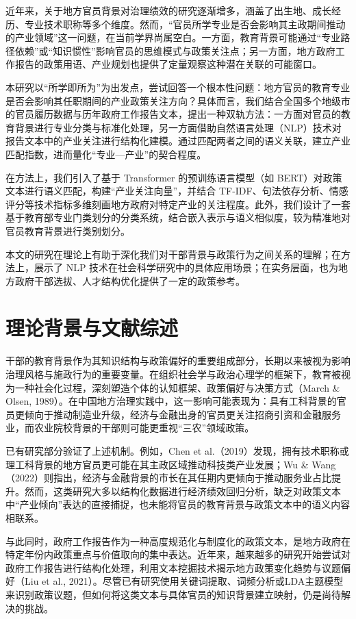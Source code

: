 \documentclass[a4paper,11pt, fontset=fandol]{ctexart}
\begin{document}
近年来，关于地方官员背景对治理绩效的研究逐渐增多，涵盖了出生地、成长经历、专业技术职称等多个维度。然而，“官员所学专业是否会影响其主政期间推动的产业领域”这一问题，在当前学界尚属空白。一方面，教育背景可能通过“专业路径依赖”或“知识惯性”影响官员的思维模式与政策关注点；另一方面，地方政府工作报告的政策用语、产业规划也提供了定量观察这种潜在关联的可能窗口。

本研究以“所学即所为”为出发点，尝试回答一个根本性问题：地方官员的教育专业是否会影响其任职期间的产业政策关注方向？具体而言，我们结合全国多个地级市的官员履历数据与历年政府工作报告文本，提出一种双轨方法：一方面对官员的教育背景进行专业分类与标准化处理，另一方面借助自然语言处理（NLP）技术对报告文本中的产业关注进行结构化建模。通过匹配两者之间的语义关联，建立产业匹配指数，进而量化“专业—产业”的契合程度。

在方法上，我们引入了基于 Transformer 的预训练语言模型（如 BERT）对政策文本进行语义匹配，构建“产业关注向量”，并结合 TF-IDF、句法依存分析、情感评分等技术指标多维刻画地方政府对特定产业的关注程度。此外，我们设计了一套基于教育部专业门类划分的分类系统，结合嵌入表示与语义相似度，较为精准地对官员教育背景进行类别划分。

本文的研究在理论上有助于深化我们对干部背景与政策行为之间关系的理解；在方法上，展示了 NLP 技术在社会科学研究中的具体应用场景；在实务层面，也为地方政府干部选拔、人才结构优化提供了一定的政策参考。


\newpage

\section{理论背景与文献综述}
干部的教育背景作为其知识结构与政策偏好的重要组成部分，长期以来被视为影响治理风格与施政行为的重要变量。在组织社会学与政治心理学的框架下，教育被视为一种社会化过程，深刻塑造个体的认知框架、政策偏好与决策方式（March \& Olsen, 1989）。在中国地方治理实践中，这一影响可能表现为：具有工科背景的官员更倾向于推动制造业升级，经济与金融出身的官员更关注招商引资和金融服务业，而农业院校背景的干部则可能更重视“三农”领域政策。

已有研究部分验证了上述机制。例如，Chen et al.（2019）发现，拥有技术职称或理工科背景的地方官员更可能在其主政区域推动科技类产业发展；Wu \& Wang（2022）则指出，经济与金融背景的市长在其任期内更倾向于推动服务业占比提升。然而，这类研究大多以结构化数据进行经济绩效回归分析，缺乏对政策文本中“产业倾向”表达的直接捕捉，也未能将官员的教育背景与政策文本中的语义内容相联系。

与此同时，政府工作报告作为一种高度规范化与制度化的政策文本，是地方政府在特定年份内政策重点与价值取向的集中表达。近年来，越来越多的研究开始尝试对政府工作报告进行结构化处理，利用文本挖掘技术揭示地方政策变化趋势与议题偏好（Liu et al., 2021）。尽管已有研究使用关键词提取、词频分析或LDA主题模型来识别政策议题，但如何将这类文本与具体官员的知识背景建立映射，仍是尚待解决的挑战。
\end{document}
